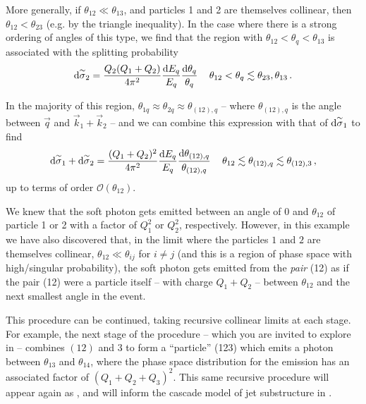 \begin{example}
    More generally, if \(\theta_{12} \ll \theta_{13}\), and particles 1 and 2 are themselves collinear, then \(\theta_{12} < \theta_{23}\) (e.g. by the triangle inequality).
    In the case where there is a strong ordering of angles of this type, we find that the region with \(\theta_{12} < \theta_q < \theta_{13}\) is associated with the splitting probability
    \begin{align}
        \dd\overset{\sim}{\sigma}_2
        =
        \frac{Q_2(Q_1 + Q_2)}{4\pi^2}
        \frac{\dd E_q}{E_q}
        \frac{\dd\theta_q}{\theta_{q}}
        \,
        &&
        \theta_{12} < \theta_q \lesssim \theta_{23},\theta_{13}
        \,.
    \end{align}

    In the majority of this region, \(\theta_{1q} \approx \theta_{2q} \approx \theta_{(12),q}\) -- where \(\theta_{(12),q}\) is the angle between \(\vec{q}\) and \(\vec{k}_1+\vec{k}_2\) --  and we can combine this expression with that of \(\dd\overset{\sim}{\sigma}_1\) to find
    \begin{align}
        \dd\overset{\sim}{\sigma}_1
        +
        \dd\overset{\sim}{\sigma}_2
        =
        \frac{(Q_1 + Q_2)^2}{4\pi^2}
        \frac{\dd E_q}{E_q}
        \frac{\dd\theta_{(12),q}}{\theta_{(12),q}}
        \,
        &&
        \theta_{12} \lesssim \theta_{(12),q} \lesssim \theta_{(12),3}
        \,,
    \end{align}
    up to terms of order \(\mathcal{O}(\theta_{12})\).

    We knew that the soft photon gets emitted between an angle of \(0\) and \(\theta_{12}\) of particle 1 or 2 with a factor of \(Q_1^2\) or \(Q_2^2\), respectively.
    However, in this example we have also discovered that, in the limit where the particles \(1\) and \(2\) are themselves collinear, \(\theta_{12} \ll \theta_{ij}\) for \(i \neq j\) (and this is a region of phase space with high/singular probability), the soft photon gets emitted from the \emph{pair} (12) as if the pair (12) were a particle itself -- with charge \(Q_1 + Q_2\) -- between \(\theta_{12}\) and the next smallest angle in the event.

    This procedure can be continued, taking recursive collinear limits at each stage.
    For example, the next stage of the procedure -- which you are invited to explore in  -- combines \((12)\) and 3 to form a ``particle'' (123) which emits a photon between \(\theta_{13}\) and \(\theta_{14}\), where the phase space distribution for the emission has an associated factor of \((Q_1 + Q_2 + Q_3)^2\).
    This same recursive procedure will appear again as , and will inform the cascade model of jet substructure in .
\end{example}



